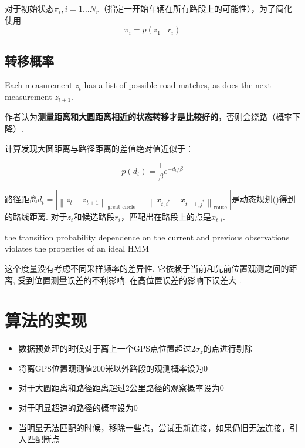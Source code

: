 对于初始状态$ \pi_{i} ,i=1 \ldots N_{r} $（指定一开始车辆在所有路段上的可能性），为了简化使用$$ \pi_{i}=p\left(z_{1} \mid r_{i}\right) $$

\subsection{转移概率}

Each measurement $ z_{t} $ has a list of possible road matches, as does the next measurement $ z_{t+1} $. 

作者认为\textbf{测量距离和大圆距离相近的状态转移才是比较好的}，否则会绕路（概率下降）. 

计算发现大圆距离与路径距离的差值绝对值近似于：

$$ p\left(d_{t}\right)=\frac{1}{\beta} e^{-d_{t} / \beta} $$

路径距离$ d_{t}=\left| \left\|z_{t}-z_{t+1}\right\|_{\text {great circle }}-\left\|x_{t, i^{*}}-x_{t+1, j^{*}}\right\|_{\text {route }}\right| $是动态规划()得到的路线距离. 对于$z_t$和候选路段$r_i$，匹配出在路段上的点是$ x_{t, i} $. 

\begin{remark}
      \label{Comment:HMM-TransitionProbability}

      the transition probability
        dependence on the current and previous observations
    violates the properties of an ideal HMM

    这个度量没有考虑不同采样频率的差异性. 它依赖于当前和先前位置观测之间的距离, 受到位置测量误差的不利影响. 在高位置误差的影响下误差大 \cite{Jagadeesh2017}.
\end{remark}

\section{算法的实现}

\begin{itemize}
    \item 数据预处理的时候对于离上一个GPS点位置超过$ 2 \sigma_{z} $的点进行剔除
    \item 将离GPS位置观测值200米以外路段的观测概率设为0
    \item 对于大圆距离和路径距离超过2公里路径的观察概率设为0
    \item 对于明显超速的路径的概率设为0
    \item 当明显无法匹配的时候，移除一些点，尝试重新连接，如果仍旧无法连接，引入匹配断点
\end{itemize}

